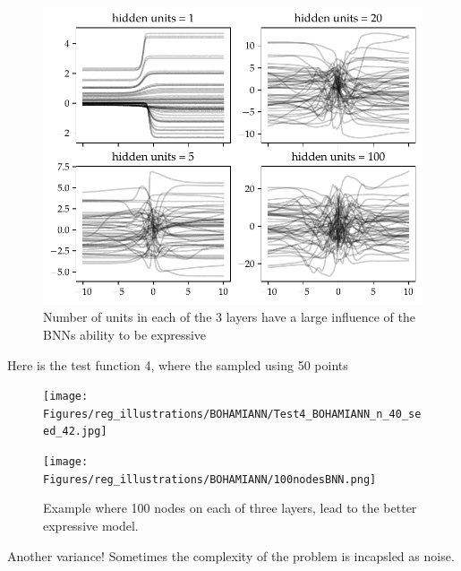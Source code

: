 \begin{figure}[H]
    \centering
    \includegraphics[width=\textwidth]{Pictures/bayesian_nn_prior_samples_hidden_units.pdf}
    \caption{Number of units in each of the 3 layers have a large influence of the BNNs ability to be expressive}
    \label{n_unit_BNN}
\end{figure}

Here is the test function 4, where the sampled using 50 points
\begin{figure}[h]
    \centering
    \begin{minipage}[b]{0.49\textwidth}
     \texttt{[image: Figures/reg\_illustrations/BOHAMIANN/Test4\_BOHAMIANN\_n\_40\_seed\_42.jpg]}
    \end{minipage}
    \hfill
    \begin{minipage}[b]{0.49\textwidth}
      \texttt{[image: Figures/reg\_illustrations/BOHAMIANN/100nodesBNN.png]}
     \end{minipage}
     \caption{Example where 100 nodes on each of three layers, lead to the better expressive model. }
\end{figure}

Another variance! Sometimes the complexity of the problem is incapsled as noise.



